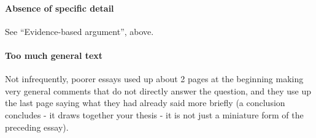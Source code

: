 \documentclass[11pt]{article}
\begin{document}
\paragraph{Absence of specific detail} See ``Evidence-based argument'', above. 

\paragraph{Too much general text} Not infrequently, poorer essays
used up about 2 pages at the beginning making very general comments
that do not directly answer the question, and they use up the last
page saying what they had already said more briefly (a conclusion
concludes - it draws together your thesis - it is not just a miniature
form of the preceding essay).


 {}
\end{document}
